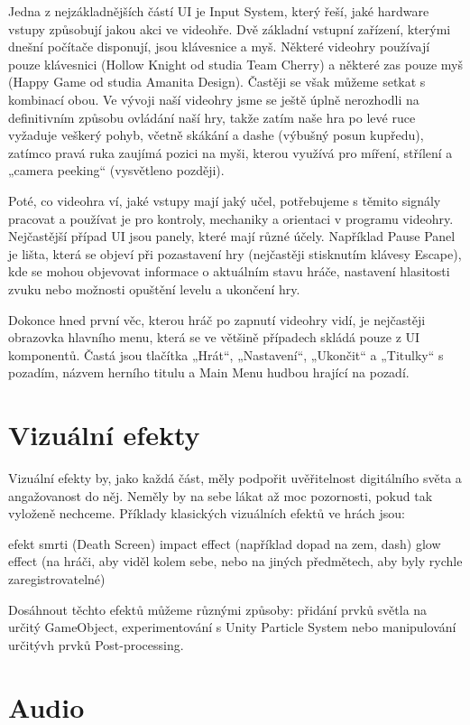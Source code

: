 Jedna z nejzákladnějších částí UI je Input System, který řeší, jaké hardware vstupy způsobují jakou akci ve videohře. Dvě základní vstupní zařízení, kterými dnešní počítače disponují, jsou klávesnice a myš. Některé videohry používají pouze klávesnici (Hollow Knight od studia Team Cherry) a některé zas pouze myš (Happy Game od studia Amanita Design). Častěji se však můžeme setkat s kombinací obou. Ve vývoji naší videohry jsme se ještě úplně nerozhodli na definitivním způsobu ovládání naší hry, takže zatím naše hra po levé ruce vyžaduje veškerý pohyb, včetně skákání a dashe (výbušný posun kupředu), zatímco pravá ruka zaujímá pozici na myši, kterou využívá pro míření, střílení a „camera peeking“ (vysvětleno později).

Poté, co videohra ví, jaké vstupy mají jaký učel, potřebujeme s těmito signály pracovat a používat je pro kontroly, mechaniky a orientaci v programu videohry. Nejčastější případ UI jsou panely, které mají různé účely. Například Pause Panel je lišta, která se objeví při pozastavení hry (nejčastěji stisknutím klávesy Escape), kde se mohou objevovat informace o aktuálním stavu hráče, nastavení hlasitosti zvuku nebo možnosti opuštění levelu a ukončení hry.

Dokonce hned první věc, kterou hráč po zapnutí videohry vidí, je nejčastěji obrazovka hlavního menu, která se ve většině případech skládá pouze z UI komponentů. Častá jsou tlačítka „Hrát“, „Nastavení“, „Ukončit“ a „Titulky“ s pozadím, názvem herního titulu a Main Menu hudbou hrající na pozadí.

\section{Vizuální efekty}
Vizuální efekty by, jako každá část, měly podpořit uvěřitelnost digitálního světa a angažovanost do něj. Neměly by na sebe lákat až moc pozornosti, pokud tak vyloženě nechceme. Příklady klasických vizuálních efektů ve hrách jsou:

efekt smrti (Death Screen)
impact effect (například dopad na zem, dash)
glow effect (na hráči, aby viděl kolem sebe, nebo na jiných předmětech, aby byly rychle zaregistrovatelné)

Dosáhnout těchto efektů můžeme různými způsoby: přidání prvků světla na určitý GameObject, experimentování s Unity Particle System nebo manipulování určitývh prvků Post-processing.

\section{Audio}

